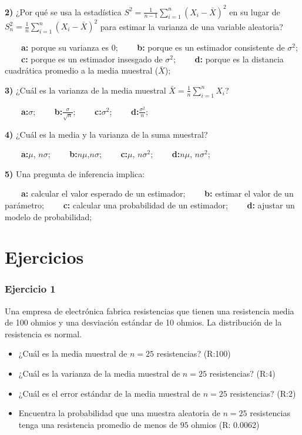 \documentclass[
]{book}
\begin{document}
\textbf{2)} ¿Por qué se usa la estadística \(S^2=\frac{1}{n-1}\sum_{i=1}^{n}(X_i -\bar{X})^2\) en su lugar de \(S_n^2=\frac{1}{n}\sum_{i=1}^{n}(X_i -\bar{X})^2\) para estimar la varianza de una variable aleatoria?

\textbf{\(\qquad\)a:} porque su varianza es \(0\);
\textbf{\(\qquad\)b:} porque es un estimador consistente de \(\sigma^2\);
\textbf{\(\qquad\)c:} porque es un estimador insesgado de \(\sigma^2\);
\textbf{\(\qquad\)d:} porque es la distancia cuadrática promedio a la media muestral (\(\bar{X}\));

\textbf{3)} ¿Cuál es la varianza de la media muestral \(\bar{X}=\frac{1}{n}\sum_{i=1}^n X_i\)?

\textbf{\(\qquad\)a:}\(\sigma\);
\textbf{\(\qquad\)b:}\(\frac{\sigma}{\sqrt{n}}\);
\textbf{\(\qquad\)c:}\(\sigma^2\);
\textbf{\(\qquad\)d:}\(\frac{\sigma^2}{n}\);

\textbf{4)} ¿Cuál es la media y la varianza de la suma muestral?

\textbf{\(\qquad\)a:}\(\mu\), \(n\sigma\);
\textbf{\(\qquad\)b:}\(n\mu\),\(n\sigma\);
\textbf{\(\qquad\)c:}\(\mu\), \(n\sigma^2\);
\textbf{\(\qquad\)d:}\(n\mu\), \(n\sigma^2\);

\textbf{5)} Una pregunta de inferencia implica:

\textbf{\(\qquad\)a:} calcular el valor esperado de un estimador;
\textbf{\(\qquad\)b:} estimar el valor de un parámetro;
\textbf{\(\qquad\)c:} calcular una probabilidad de un estimador;
\textbf{\(\qquad\)d:} ajustar un modelo de probabilidad;

\hypertarget{ejercicios-8}{%
\section{Ejercicios}\label{ejercicios-8}}

\hypertarget{ejercicio-1-7}{%
\subsubsection{Ejercicio 1}\label{ejercicio-1-7}}

Una empresa de electrónica fabrica resistencias que tienen una resistencia media de 100 ohmios y
una desviación estándar de 10 ohmios. La distribución de la resistencia es normal.

\begin{itemize}
\item
  ¿Cuál es la media muestral de \(n=25\) resistencias? (R:100)
\item
  ¿Cuál es la varianza de la media muestral de \(n=25\) resistencias? (R:4)
\item
  ¿Cuál es el error estándar de la media muestral de \(n=25\) resistencias? (R:2)
\item
  Encuentra la probabilidad
  que una muestra aleatoria de \(n = 25\) resistencias tenga una resistencia promedio de menos de \(95\) ohmios (R: 0.0062)
\end{itemize}
\end{document}
